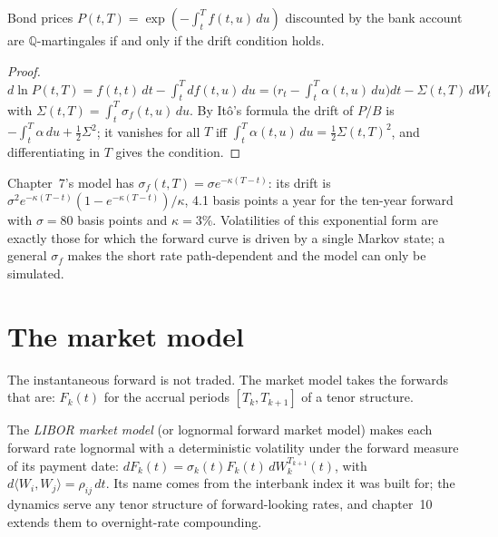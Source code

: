 \begin{proposition}\label{prop:rc:forward-rate-and-market-models:drift}
Bond prices $P(t,T) = \exp(-\int_t^Tf(t,u)\,du)$ discounted by the bank account
are $\mathbb Q$-martingales if and only if the drift condition holds.
\end{proposition}
\begin{proof}
$d\ln P(t,T) = f(t,t)\,dt-\int_t^Td f(t,u)\,du = \bigl(r_t-\int_t^T\alpha(t,u)\,du\bigr)dt
-\Sigma(t,T)\,dW_t$ with $\Sigma(t,T)=\int_t^T\sigma_f(t,u)\,du$. By Itô's formula
the drift of $P/B$ is $-\int_t^T\alpha\,du+\frac12\Sigma^2$; it vanishes for all
$T$ iff $\int_t^T\alpha(t,u)\,du = \frac12\Sigma(t,T)^2$, and differentiating in $T$
gives the condition.
\end{proof}

\begin{example}\label{ex:rc:forward-rate-and-market-models:hw}
Chapter~7's model has $\sigma_f(t,T) = \sigma e^{-\kappa(T-t)}$: its drift is
$\sigma^2e^{-\kappa(T-t)}(1-e^{-\kappa(T-t)})/\kappa$, 4.1 basis points a year for the
ten-year forward with $\sigma = 80$ basis points and $\kappa = 3\%$. Volatilities of
this exponential form are exactly those for which the forward curve is driven by
a single Markov state; a general $\sigma_f$ makes the short rate path-dependent
and the model can only be simulated.
\end{example}

\section{The market model}

The instantaneous forward is not traded. The market model takes the forwards
that are: $F_k(t)$ for the accrual periods $[T_k,T_{k+1}]$ of a tenor structure.

\begin{definition}\label{def:rc:forward-rate-and-market-models:lmm}
The \emph{LIBOR market model} (or lognormal forward
market model) makes each forward rate lognormal with a deterministic volatility
under the forward measure of its payment date:
$dF_k(t) = \sigma_k(t)F_k(t)\,dW^{T_{k+1}}_k(t)$, with $d\langle W_i,W_j\rangle =
\rho_{ij}\,dt$. Its name comes from the interbank index it was built for; the
dynamics serve any tenor structure of forward-looking rates, and chapter~10
extends them to overnight-rate compounding.
\end{definition}

